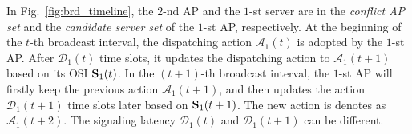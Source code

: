 \begin{example}
    In Fig.~\ref{fig:brd_timeline}, the $2$-nd AP and the $1$-st server are in the \emph{conflict AP set} and the \emph{candidate server set} of the $1$-st AP, respectively.
    At the beginning of the $t$-th broadcast interval, the dispatching action $\mathcal{A}_{1}(t)$ is adopted by the $1$-st AP.
    After $\mathcal{D}_{1}(t)$ time slots, it updates the dispatching action to $\mathcal{A}_{1}(t+1)$ based on its OSI $\mathbf{S}_{1}(t)$.
    In the $(t+1)$-th broadcast interval, the $1$-st AP will firstly keep the previous action $\mathcal{A}_{1}(t+1)$, and then updates the action $\mathcal{D}_{1}(t+1)$ time slots later based on $\mathbf{S}_{1}(t+1)$. The new action is denotes as $\mathcal{A}_{1}(t+2)$.
    The signaling latency $\mathcal{D}_1(t)$ and $\mathcal{D}_1(t+1)$ can be different.
\end{example}

%

